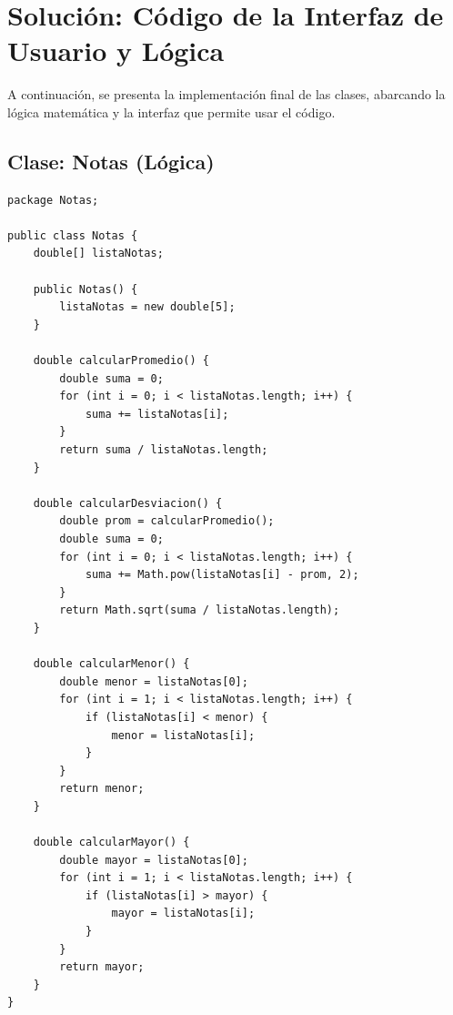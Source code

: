 \documentclass[12pt,a4paper]{article}
\begin{document}
\section{Solución: Código de la Interfaz de Usuario y Lógica}
A continuación, se presenta la implementación final de las clases, abarcando la lógica matemática y la interfaz que permite usar el código.

\subsection*{Clase: Notas (Lógica)}
\begin{lstlisting}[caption={Clase Notas.java}]
package Notas;

public class Notas {
    double[] listaNotas;

    public Notas() {
        listaNotas = new double[5];
    }

    double calcularPromedio() {
        double suma = 0;
        for (int i = 0; i < listaNotas.length; i++) {
            suma += listaNotas[i];
        }
        return suma / listaNotas.length;
    }

    double calcularDesviacion() {
        double prom = calcularPromedio();
        double suma = 0;
        for (int i = 0; i < listaNotas.length; i++) {
            suma += Math.pow(listaNotas[i] - prom, 2);
        }
        return Math.sqrt(suma / listaNotas.length);
    }

    double calcularMenor() {
        double menor = listaNotas[0];
        for (int i = 1; i < listaNotas.length; i++) {
            if (listaNotas[i] < menor) {
                menor = listaNotas[i];
            }
        }
        return menor;
    }

    double calcularMayor() {
        double mayor = listaNotas[0];
        for (int i = 1; i < listaNotas.length; i++) {
            if (listaNotas[i] > mayor) {
                mayor = listaNotas[i];
            }
        }
        return mayor;
    }
}
\end{lstlisting}
\end{document}

